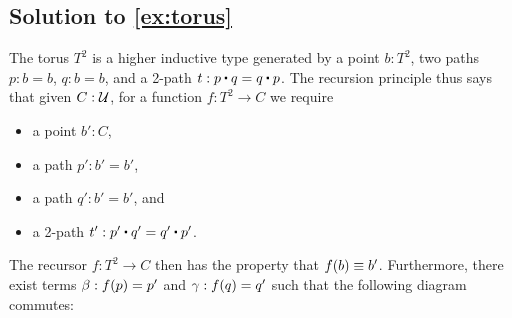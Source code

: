 \documentclass[
%
%
11pt %
]{article}
\begin{document}
\subsection*{Solution to \cref{ex:torus}}
The torus $T^2$ is a higher inductive type generated by a point $b : T^2$, two paths $p : b = b$, $q : b = b$, and a 2-path $t : p \ct q = q \ct p$. The recursion principle thus says that given $C : \mathcal{U}$, for a function $f : T^2 \to C$ we require
\begin{itemize}
\item a point $b':C$,
\item a path $p' : b' = b'$,
\item a path $q' : b' = b'$, and
\item a 2-path $t' : p' \ct q' = q' \ct p'$.
\end{itemize}
The recursor $f : T^2 \to C$ then has the property that $f(b) \equiv b'$. Furthermore, there exist terms $\beta : {f}\mathopen{}\left({p}\right)\mathclose{} = p'$ and $\gamma : {f}\mathopen{}\left({q}\right)\mathclose{} = q'$ such that the following diagram commutes:
\begin{center}
\end{center}
\end{document}
